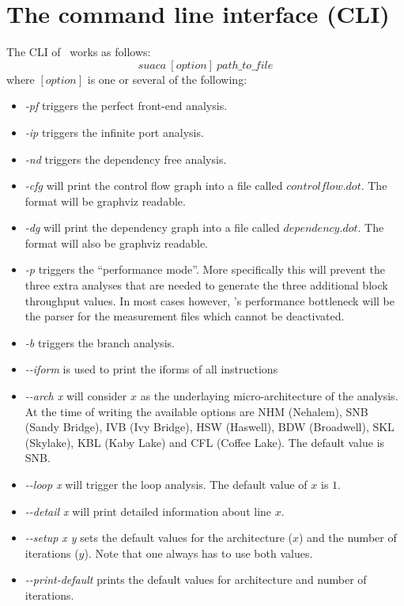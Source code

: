\section{The command line interface (CLI)}
The CLI of \suaca\ works as follows:\\
\[
suaca\ [option]\ path\_to\_file
\]
where $[option]$ is one or several of the following:
\begin{itemize}
    \item \emph{-pf} triggers the perfect front-end analysis.
    \item \emph{-ip} triggers the infinite port analysis.
    \item \emph{-nd} triggers the dependency free analysis. 
    \item \emph{-cfg} will print the control flow graph into a file called $controlflow.dot$. The format will be graphviz readable.
    \item \emph{-dg} will print the dependency graph into a file called $dependency.dot$. The format will also be graphviz readable.
    \item \emph{-p} triggers the ``performance mode''. More specifically this will prevent the three extra analyses that are needed to generate the three additional block throughput values. In most cases however, \suaca's performance bottleneck will be the parser for the measurement files which cannot be deactivated. 
    \item \emph{-b} triggers the branch analysis.
    \item \emph{-{}-iform} is used to print the iforms of all instructions
    \item \emph{-{}-arch x} will consider $x$ as the underlaying micro-architecture of the analysis. At the time of writing the available options are NHM (Nehalem), SNB (Sandy Bridge), IVB (Ivy Bridge), HSW (Haswell), BDW (Broadwell), SKL (Skylake), KBL (Kaby Lake) and CFL (Coffee Lake). The default value is SNB.
    \item \emph{-{}-loop x} will trigger the loop analysis. The default value of $x$ is $1$.
    \item \emph{-{}-detail x} will print detailed information about line $x$.
     \item \emph{-{}-setup x y} sets the default values for the architecture ($x$) and the number of iterations ($y$). Note that one always has to use both values. 
    \item \emph{-{}-print-default} prints the default values for architecture and number of iterations.
\end{itemize}



